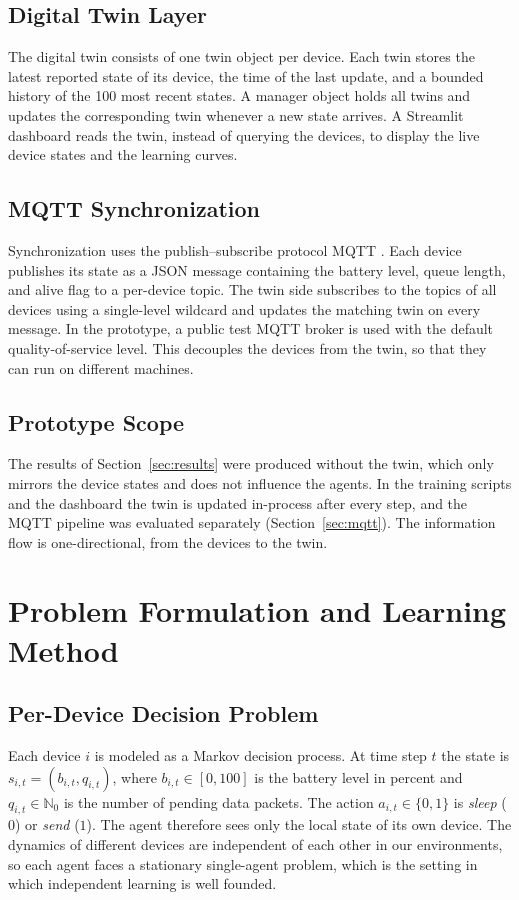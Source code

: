 \documentclass[conference]{IEEEtran}
\begin{document}
\subsection{Digital Twin Layer}
The digital twin consists of one twin object per device. Each twin stores the latest reported state of its device, the time of the last update, and a bounded history of the 100 most recent states. A manager object holds all twins and updates the corresponding twin whenever a new state arrives. A Streamlit dashboard reads the twin, instead of querying the devices, to display the live device states and the learning curves.

\subsection{MQTT Synchronization}
Synchronization uses the publish--subscribe protocol MQTT \cite{mqtt}. Each device publishes its state as a JSON message containing the battery level, queue length, and alive flag to a per-device topic. The twin side subscribes to the topics of all devices using a single-level wildcard and updates the matching twin on every message. In the prototype, a public test MQTT broker is used with the default quality-of-service level. This decouples the devices from the twin, so that they can run on different machines.

\subsection{Prototype Scope}
The results of Section~\ref{sec:results} were produced without the twin, which only mirrors the device states and does not influence the agents. In the training scripts and the dashboard the twin is updated in-process after every step, and the MQTT pipeline was evaluated separately (Section~\ref{sec:mqtt}). The information flow is one-directional, from the devices to the twin.

\section{Problem Formulation and Learning Method}
\label{sec:method}

\subsection{Per-Device Decision Problem}
Each device $i$ is modeled as a Markov decision process. At time step $t$ the state is $s_{i,t}=(b_{i,t}, q_{i,t})$, where $b_{i,t}\in[0,100]$ is the battery level in percent and $q_{i,t}\in\mathbb{N}_0$ is the number of pending data packets. The action $a_{i,t}\in\{0,1\}$ is \emph{sleep} ($0$) or \emph{send} ($1$). The agent therefore sees only the local state of its own device. The dynamics of different devices are independent of each other in our environments, so each agent faces a stationary single-agent problem, which is the setting in which independent learning is well founded.
\end{document}
